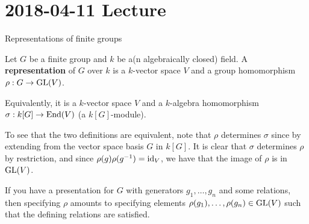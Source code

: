 \section{2018-04-11 Lecture}

Representations of finite groups

\begin{defn}
	Let $G$ be a finite group and $k$ be a(n algebraically closed) field.
	A \textbf{representation} of $G$ over $k$ is a $k$-vector space $V$ and a group homomorphism $\rho: G \to \operatorname{GL}(V)$.
	
	Equivalently, it is a $k$-vector space $V$ and a $k$-algebra homomorphism $\sigma: k[G] \to \operatorname{End}(V)$ (a $k[G]$-module).
\end{defn}

\begin{rmk}
	To see that the two definitions are equivalent, note that $\rho$ determines $\sigma$ since by extending from the vector space basis $G$ in $k[G]$.
	It is clear that $\sigma$ determines $\rho$ by restriction, and since $\rho(g)\rho(g^{-1})=\operatorname{id}_V$, we have that the image of $\rho$ is in $\operatorname{GL}(V)$.
\end{rmk}

\begin{rmk}
	If you have a presentation for $G$ with generators $g_1,\ldots,g_n$ and some relations, then specifying $\rho$ amounts to specifying elements $\rho(g_1),\ldots,\rho(g_n) \in \operatorname{GL}(V)$ such that the defining relations are satisfied.
\end{rmk}

